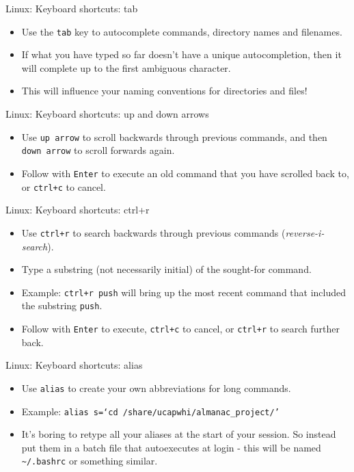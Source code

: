\documentclass{beamer}
\newcommand{\command}[1]{\colorbox{light-gray}{\texttt{#1}}}
\newcommand{\filename}[1]{\colorbox{light-green}{\texttt{#1}}}
\begin{document}
\begin{frame}{Linux: Keyboard shortcuts: tab}
  \begin{itemize}
    \item Use the \command{tab} key to autocomplete commands, directory names and filenames.
    \item If what you have typed so far doesn't have a unique autocompletion, then it will complete up to the first ambiguous character.
    \item This will influence your naming conventions for directories and files!
  \end{itemize}
\end{frame}


\begin{frame}{Linux: Keyboard shortcuts: up and down arrows}
  \begin{itemize}
    \item Use \command{up arrow} to scroll backwards through previous commands, and then \command{down arrow} to scroll forwards again.
    \item Follow with \command{Enter} to execute an old command that you have scrolled back to, or \command{ctrl+c} to cancel.
  \end{itemize}
\end{frame}


\begin{frame}{Linux: Keyboard shortcuts: ctrl+r}
  \begin{itemize}
    \item Use \command{ctrl+r} to search backwards through previous commands (\textit{reverse-i-search}).
    \item Type a substring (not necessarily initial) of the sought-for command.
    \item Example: \command{ctrl+r push} will bring up the most recent command that included the substring \command{push}.
    \item Follow with \command{Enter} to execute, \command{ctrl+c} to cancel, or \command{ctrl+r} to search further back.
  \end{itemize}
\end{frame}


\begin{frame}{Linux: Keyboard shortcuts: alias}
  \begin{itemize}
    \item Use \command{alias} to create your own abbreviations for long commands.
    \item Example: \command{alias s=`cd /share/ucapwhi/almanac\_project/'}
    \item It's boring to retype all your aliases at the start of your session. So instead put them in a batch file that autoexecutes at login - this will be named \filename{\textasciitilde/.bashrc} or something similar.
  \end{itemize}
\end{frame}
\end{document}
